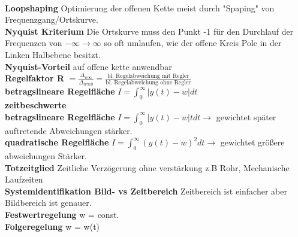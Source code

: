 \documentclass{article}
\begin{document}
\begin{multicols}{6}
\\
\textbf{Loopshaping} Optimierung der offenen Kette meist durch "Spaping" von Frequenzgang/Ortskurve.
\\
\textbf{Nyquist Kriterium}
Die Ortskurve muss den Punkt -1 für den Durchlauf der Frequenzen von $-\infty \rightarrow \infty$ so oft umlaufen, wie der offene Kreis Pole in der Linken Halbebene besitzt. \\
\textbf{Nyquist-Vorteil} auf offene kette anwendbar
\\
\textbf{Regelfaktor R} $=\frac{\Delta_{w \infty}}{\Delta_{w \infty 0}}=\frac{\text {bl. Regelabweichung mit Regler}}{\text {bl. Regelabweichung ohne Regler}}$
\\
\textbf{betragslineare Regelfläche} $I=\int_{0}^{\infty}|y(t)-w| d t$
\\
\textbf{zeitbeschwerte \\betragslineare Regelfläche} $I=\int_{0}^{\infty}|y(t)-w|t d t \rightarrow$ gewichtet später auftretende Abweichungen stärker.
\\
\textbf{quadratische Regelfläche} $I=\int_{0}^{\infty}(y(t)-w)^{2} d t \rightarrow$ gewichtet größere abweichungen Stärker.
\\
\textbf{Totzeitglied} Zeitliche Verzögerung ohne verstärkung z.B Rohr, Mechanische Laufzeiten
\\
\textbf{Systemidentifikation Bild- vs Zeitbereich} Zeitbereich ist einfacher aber Bildbereich ist genauer.
\\
\textbf{Festwertregelung} w = const.
\\
\textbf{Folgeregelung} w = w(t)

\begin{figure}[H]



\end{figure}
\end{multicols}
\end{document}
